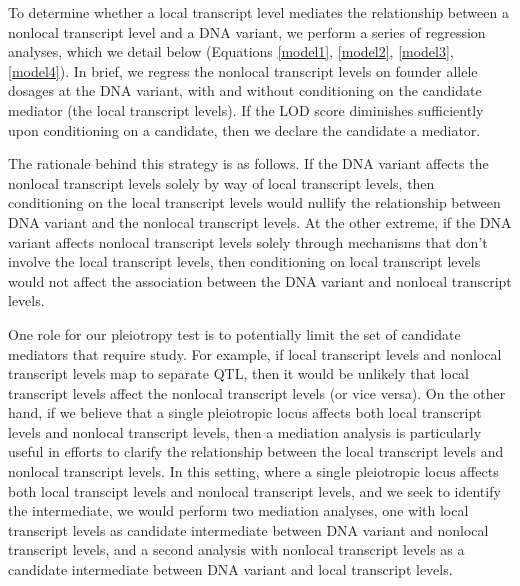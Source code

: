\documentclass[oneside]{book}
\begin{document}
To determine whether a local transcript level mediates the relationship between a nonlocal transcript level and a DNA variant, we perform a series of regression analyses, which we detail below (Equations \ref{model1}, \ref{model2}, \ref{model3}, \ref{model4}). In brief, we regress the nonlocal transcript levels on founder allele dosages at the DNA variant, with and without conditioning on the candidate mediator (the local transcript levels). If the LOD score diminishes sufficiently upon conditioning on a candidate, then we declare the candidate a mediator.

The rationale behind this strategy is as follows. If the DNA variant affects the nonlocal transcript levels solely by way of local transcript levels, then conditioning on the local transcript levels would nullify the relationship between DNA variant and the nonlocal transcript levels. At the other extreme, if the DNA variant affects nonlocal transcript levels solely through mechanisms that don't involve the local transcript levels, then conditioning on local transcript levels would not affect the association between the DNA variant and nonlocal transcript levels.

One role for our pleiotropy test is to potentially limit the set of candidate mediators that require study. For example, if local transcript levels and nonlocal transcript levels map to separate QTL, then it would be unlikely that local transcript levels affect the nonlocal transcript levels (or vice versa). On the other hand, if we believe that a single pleiotropic locus affects both local transcript levels and nonlocal transcript levels, then a mediation analysis is particularly useful in efforts to clarify the relationship between the local transcript levels and nonlocal transcript levels. In this setting, where a single pleiotropic locus affects both local transcipt levels and nonlocal transcript levels, and we seek to identify the intermediate, we would perform two mediation analyses, one with local transcript levels as candidate intermediate between DNA variant and nonlocal transcript levels, and a second analysis with nonlocal transcript levels as a candidate intermediate between DNA variant and local transcript levels.


\end{document}
